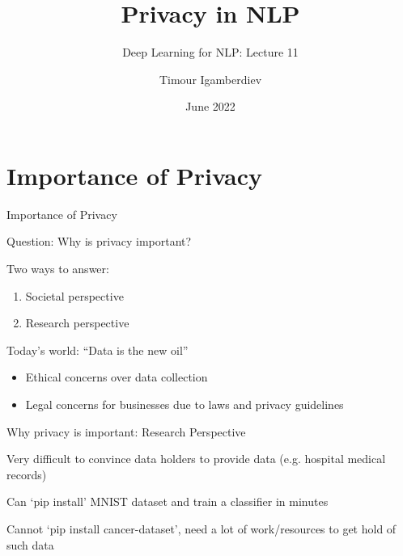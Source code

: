 \documentclass[12pt,aspectratio=169]{beamer}
\title{Privacy in NLP}
\subtitle{Deep Learning for NLP: Lecture 11}
\date{June 2022}
\author{Timour Igamberdiev}
\begin{document}

\maketitle


\section{Importance of Privacy}

\begin{frame}{Importance of Privacy}

Question: Why is privacy important?

Two ways to answer:
\begin{enumerate}
    \item Societal perspective
    \item Research perspective
\end{enumerate}

Today's world: ``Data is the new oil''
\begin{itemize}
    \item Ethical concerns over data collection
    \item Legal concerns for businesses due to laws and privacy guidelines
\end{itemize}

\end{frame}

\begin{frame}{Why privacy is important: Research Perspective}

Very difficult to convince data holders to provide data (e.g. hospital medical records)

Can `pip install' MNIST dataset and train a classifier in minutes

Cannot `pip install cancer-dataset', need a lot of work/resources to get hold of such data

\end{frame}
\end{document}

